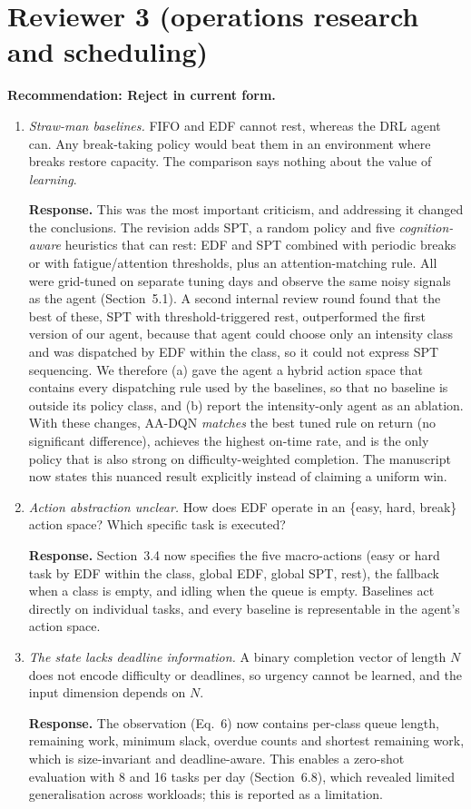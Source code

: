 \documentclass[11pt]{article}
\newcommand{\resp}[1]{\par\noindent\textbf{Response.} #1\par\medskip}
\begin{document}
\section{Reviewer 3 (operations research and scheduling)}
\textbf{Recommendation: Reject in current form.}
\begin{enumerate}[label=R3.\arabic*]
\item \textit{Straw-man baselines.} FIFO and EDF cannot rest, whereas the DRL agent can. Any break-taking policy would beat them in an environment where breaks restore capacity. The comparison says nothing about the value of \emph{learning}.
\resp{This was the most important criticism, and addressing it changed the conclusions. The revision adds SPT, a random policy and five \emph{cognition-aware} heuristics that can rest: EDF and SPT combined with periodic breaks or with fatigue/attention thresholds, plus an attention-matching rule. All were grid-tuned on separate tuning days and observe the same noisy signals as the agent (Section~5.1). A second internal review round found that the best of these, SPT with threshold-triggered rest, outperformed the first version of our agent, because that agent could choose only an intensity class and was dispatched by EDF within the class, so it could not express SPT sequencing. We therefore (a) gave the agent a hybrid action space that contains every dispatching rule used by the baselines, so that no baseline is outside its policy class, and (b) report the intensity-only agent as an ablation. With these changes, AA-DQN \emph{matches} the best tuned rule on return (no significant difference), achieves the highest on-time rate, and is the only policy that is also strong on difficulty-weighted completion. The manuscript now states this nuanced result explicitly instead of claiming a uniform win.}
\item \textit{Action abstraction unclear.} How does EDF operate in an \{easy, hard, break\} action space? Which specific task is executed?
\resp{Section~3.4 now specifies the five macro-actions (easy or hard task by EDF within the class, global EDF, global SPT, rest), the fallback when a class is empty, and idling when the queue is empty. Baselines act directly on individual tasks, and every baseline is representable in the agent's action space.}
\item \textit{The state lacks deadline information.} A binary completion vector of length $N$ does not encode difficulty or deadlines, so urgency cannot be learned, and the input dimension depends on $N$.
\resp{The observation (Eq.~6) now contains per-class queue length, remaining work, minimum slack, overdue counts and shortest remaining work, which is size-invariant and deadline-aware. This enables a zero-shot evaluation with 8 and 16 tasks per day (Section~6.8), which revealed limited generalisation across workloads; this is reported as a limitation.}

\end{enumerate}
\end{document}
